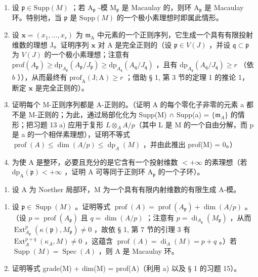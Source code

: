 \begin{enumerate}
\def\labelenumi{\alph{enumi})}
\setcounter{enumi}{1}
\item
  设 \(\mathfrak{p} \in \mathrm{Supp}(M)\) ；若 \(\mathrm{A}_{\mathfrak{p}}\) -模 \(\mathrm{M}_{\mathfrak{p}}\) 是 Macaulay 的，则环 \(\mathrm{A}_{\mathfrak{p}}\) 是 Macaulay 环。特别地，当 \(\mathfrak{p}\) 是 \(\mathrm{Supp}(M)\) 的一个极小素理想时即属此情形。
\item
  设 \(\mathbf{x} = (x_{1},\ldots ,x_{r})\) 为 \(\mathfrak{m}_{\mathrm{A}}\) 中元素的一个正则序列，它生成一个具有有限投射维数的理想 J。证明序列 \(\mathbf{x}\) 对 A 是完全正则的（设 \(\mathfrak{p}\in V(J)\) ，并设 \(\mathfrak{q}\subset \mathfrak{p}\) 为 \(V(J)\) 的一个极小素理想；注意有 \(\mathrm{prof}(A_{\mathfrak{p}})\geqslant \mathrm{dp}_{A_{\mathfrak{p}}}(A_{\mathfrak{p}} / J_{\mathfrak{p}})\geqslant \mathrm{dp}_{A_{\mathfrak{q}}}(A_{\mathfrak{q}} / J_{\mathfrak{q}})\) ，且有 \(\mathrm{dp}_{A_{\mathfrak{q}}}(A_{\mathfrak{q}} / J_{\mathfrak{q}})\geqslant r\) （依 \(b\) ）），从而最终有 \(\mathrm{prof}_{\mathrm{A}}(\mathrm{J};\mathrm{A})\geqslant r\) ；借助 § 1, 第 3 节的定理 1 的推论 1，断定 \(\mathbf{x}\) 是完全正则的）。
\item
  证明每个 M-正则序列都是 A-正则的。（证明 A 的每个零化子非零的元素 a 都不是 M-正则的；为此，通过局部化化为 Supp(M) ∩ Supp(a) = \(\{\mathfrak{m}_{A}\}\) 的情形；把习题 13 a) 应用于复形 \(L \otimes_A A/p\)（其中 L 是 M 的一个自由分解，而 p 是 a 的一个相伴素理想），证明不等式 \(\operatorname{prof}(A) \leqslant \dim(A/p) \leqslant \operatorname{dp}_{A}(M)\) ，并由此推出 prof(M) = 0。）
\item
  为使 A 是整环，必要且充分的是它含有一个投射维数 \(< +\infty\) 的素理想（若 \(\mathrm{dp}_{\mathrm{A}}(\mathfrak{p}) < +\infty\) ，证明 A 可等同于正则环 \(\mathrm{A}_{\mathfrak{p}}\) 的一个子环）。
\end{enumerate}

\begin{enumerate}
\def\labelenumi{\arabic{enumi})}
\setcounter{enumi}{14}
\tightlist
\item
  设 A 为 Noether 局部环，M 为一个具有有限内射维数的有限生成 A-模。
\end{enumerate}

\begin{enumerate}
\def\labelenumi{\alph{enumi})}
\item
  设 \(\mathfrak{p} \in \operatorname{Supp}(M)\) 。证明等式 \(\operatorname{prof}(A) = \operatorname{prof}(A_{\mathfrak{p}}) + \dim(A/p)\) 。（设 \(p = \operatorname{prof}(A_{\mathfrak{p}})\) 且 \(q = \dim(A/p)\) ；注意有 \(p = \operatorname{di}_{A_{\mathfrak{p}}} (M_{\mathfrak{p}})\) ，从而 \(\operatorname{Ext}_{A_{\mathfrak{p}}}^{p}(\kappa(\mathfrak{p}), M_{\mathfrak{p}}) \neq 0\) ，故依 § 1, 第 7 节的引理 3 有 \(\operatorname{Ext}_{A}^{p+q}(\kappa_A, M) \neq 0\) ，这蕴含 \(\operatorname{prof}(A) = \operatorname{di}_A(M) = p + q\) 。）若 \(\operatorname{Supp}(M) = \operatorname{Spec}(A)\) ，则 A 是 Macaulay 环。
\item
  证明等式 grade(M) + dim(M) = prof(A)（利用 a) 以及 § 1 的习题 15）。
\end{enumerate}

